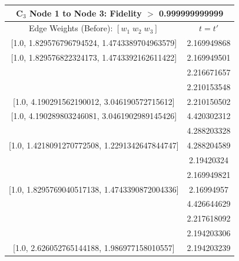 \documentclass[reprint, aps, 12pt, floatfix]{revtex4-2}
\begin{document}
\begin{center}
    \begin{tabular}{||c c||}
        \multicolumn{2}{c}{C$_3$ Node 1 to Node 3: Fidelity $>$ 0.999999999999}\\
        \hline
        Edge Weights (Before): $[w_1 \; w_2 \; w_3]$&$t=t'$\\
        \hline

        [1.0, 1.829576796794524, 1.4743389704963579]&2.169949868\\

        [1.0, 1.829576822324173, 1.4743392162611422]&2.169949501\\
        \hline
        [1.0, 6.515031592899615, 4.66077312237574]&2.216671657\\
        \hline
        [1.0, 4.190286191473313, 3.0461851966572087]&2.210153548\\

        [1.0, 4.190291562190012, 3.046190572715612]&2.210150502\\

        [1.0, 4.190289803246081, 3.0461902989145426]&4.420302312\\
        \hline
        [1.0, 1.4218099169058493, 1.2291346399776408]&4.288203328\\

        [1.0, 1.4218091270772508, 1.2291342647844747]&4.288204589\\
        \hline
        [1.0, 2.6260527751986107, 1.9869771197637223]&2.19420324\\
        \hline
        [1.0, 1.829576767196629, 1.4743388038769978]&2.169949821\\

        [1.0, 1.8295769040517138, 1.4743390872004336]&2.16994957\\
        \hline
        [1.0, 4.966767805859688, 3.5825097108373787]&4.426644629\\
        \hline
        [1.0, 7.287800965791545, 5.2015386755525235]&2.217618092\\
        \hline
        [1.0, 2.6260527073545514, 1.986977127650279]&2.194203306\\

        [1.0, 2.626052765144188, 1.986977158010557]&2.194203239\\
        \hline
    \end{tabular}
\end{center}
\end{document}
